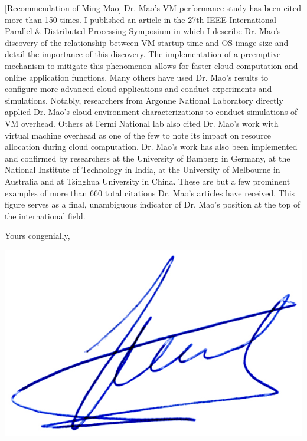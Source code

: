 \documentclass[a4paper,10pt]{article}
\begin{document}
\begin{letter}[Recommendation of Ming Mao]
Dr. Mao’s VM performance study has been  cited more than 150 times.  I published
an article  in the  27th IEEE International  Parallel \&  Distributed Processing
Symposium in which I describe Dr. Mao’s discovery of the relationship between VM
startup time and OS image size and detail the importance of this discovery.  The
implementation of a preemptive mechanism  to mitigate this phenomenon allows for
faster cloud computation and online application functions. Many others have used
Dr.  Mao’s  results to  configure more advanced  cloud applications  and conduct
experiments  and  simulations.   Notably,   researchers  from  Argonne  National
Laboratory directly  applied Dr.   Mao’s cloud environment  characterizations to
conduct simulations of VM overhead. Others  at Fermi National lab also cited Dr.
Mao’s work with virtual machine overhead as one of the few to note its impact on
resource allocation  during cloud  computation.  Dr.  Mao’s  work has  also been
implemented  and  confirmed by  researchers  at  the  University of  Bamberg  in
Germany, at the National Institute of  Technology in India, at the University of
Melbourne in Australia and at Tsinghua University  in China. These are but a few
prominent examples  of more  than 660  total citations  Dr. Mao’s  articles have
received. This  figure serves as  a final,  unambiguous indicator of  Dr.  Mao’s
position at the top of the international field.

Yours congenially,




\end{letter}
\begin{flushright}
\includegraphics[width=.30\textwidth]{signgenaud.jpg}
\end{flushright}
%
%
\end{document}
